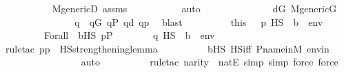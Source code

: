 \begin{isabellebody}
\ \ \ \ \ \ \ \ \isamarkupfalse%
\ M{\isacharunderscore}{\kern0pt}genericD\ assms\ \isanewline
\ \ \ \ \ \ \ \ \isamarkupfalse%
\ auto\isanewline
\ \ \ \ \ \ \isamarkupfalse%
\isanewline
\ \ \ \ \ \ \isamarkupfalse%
\ {\isacartoucheopen}d{\isasymin}G{\isacartoucheclose}\ {\isacartoucheopen}M{\isacharunderscore}{\kern0pt}generic{\isacharparenleft}{\kern0pt}G{\isacharparenright}{\kern0pt}{\isacartoucheclose}\isanewline
\ \ \ \ \ \ \isamarkupfalse%
\isanewline
\ \ \ \ \ \ \isamarkupfalse%
\ q\ \ {\isachardoublequoteopen}q{\isasymin}G{\isachardoublequoteclose}\ {\isachardoublequoteopen}q{\isasymin}P{\isachardoublequoteclose}\ {\isachardoublequoteopen}q{\isasympreceq}d{\isachardoublequoteclose}\ {\isachardoublequoteopen}q{\isasympreceq}p{\isachardoublequoteclose}\ \isamarkupfalse%
\ blast\isanewline
\ \ \ \ \ \ \isamarkupfalse%
\ \isamarkupfalse%
\ this\ \ \ {\isacartoucheopen}p\ {\isasymtturnstile}HS\ {\isasymphi}\ {\isacharparenleft}{\kern0pt}{\isacharbrackleft}{\kern0pt}b{\isacharbrackright}{\kern0pt}\ {\isacharat}{\kern0pt}\ env{\isacharparenright}{\kern0pt}{\isacartoucheclose}\ \isanewline
\ \ \ \ \ \ \ \ Forall\ \ {\isacartoucheopen}b{\isasymin}HS{\isacartoucheclose}\ {\isacartoucheopen}p{\isasymin}P{\isacartoucheclose}\isanewline
\ \ \ \ \ \ \isamarkupfalse%
\ {\isachardoublequoteopen}q\ {\isasymtturnstile}HS\ {\isasymphi}\ {\isacharparenleft}{\kern0pt}{\isacharbrackleft}{\kern0pt}b{\isacharbrackright}{\kern0pt}\ {\isacharat}{\kern0pt}\ env{\isacharparenright}{\kern0pt}{\isachardoublequoteclose}\isanewline
\ \ \ \ \ \ \ \ \isamarkupfalse%
{\isacharparenleft}{\kern0pt}rule{\isacharunderscore}{\kern0pt}tac\ p{\isacharequal}{\kern0pt}p\ \ HS{\isacharunderscore}{\kern0pt}strengthening{\isacharunderscore}{\kern0pt}lemma{\isacharparenright}{\kern0pt}\isanewline
\ \ \ \ \ \ \ \ \isamarkupfalse%
\ {\isacartoucheopen}b{\isasymin}HS{\isacartoucheclose}\ HS{\isacharunderscore}{\kern0pt}iff\ P{\isacharunderscore}{\kern0pt}name{\isacharunderscore}{\kern0pt}in{\isacharunderscore}{\kern0pt}M\ envin\isanewline
\ \ \ \ \ \ \ \ \ \ \ \ \ \ \isamarkupfalse%
\ auto{\isacharbrackleft}{\kern0pt}{}{\isacharbrackright}{\kern0pt}\isanewline
\ \ \ \ \ \ \ \ \ \isamarkupfalse%
{\isacharparenleft}{\kern0pt}rule{\isacharunderscore}{\kern0pt}tac\ n{\isacharequal}{\kern0pt}{\isachardoublequoteopen}arity{\isacharparenleft}{\kern0pt}{\isasymphi}{\isacharparenright}{\kern0pt}{\isachardoublequoteclose}\ \ natE{\isacharcomma}{\kern0pt}\ simp{\isacharcomma}{\kern0pt}\ simp{\isacharcomma}{\kern0pt}\ force{\isacharcomma}{\kern0pt}\ force{\isacharparenright}{\kern0pt}\isanewline

\end{isabellebody}
